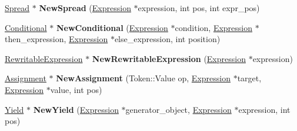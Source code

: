 \begin{DoxyCompactItemize}
\item 
\hyperlink{classv8_1_1internal_1_1_spread}{Spread} $\ast$ {\bfseries New\+Spread} (\hyperlink{classv8_1_1internal_1_1_expression}{Expression} $\ast$expression, int pos, int expr\+\_\+pos)\hypertarget{classv8_1_1internal_1_1_b_a_s_e___e_m_b_e_d_d_e_d_a90de6cb9daeadcda2559c1b87ccb95bd}{}\label{classv8_1_1internal_1_1_b_a_s_e___e_m_b_e_d_d_e_d_a90de6cb9daeadcda2559c1b87ccb95bd}

\item 
\hyperlink{classv8_1_1internal_1_1_conditional}{Conditional} $\ast$ {\bfseries New\+Conditional} (\hyperlink{classv8_1_1internal_1_1_expression}{Expression} $\ast$condition, \hyperlink{classv8_1_1internal_1_1_expression}{Expression} $\ast$then\+\_\+expression, \hyperlink{classv8_1_1internal_1_1_expression}{Expression} $\ast$else\+\_\+expression, int position)\hypertarget{classv8_1_1internal_1_1_b_a_s_e___e_m_b_e_d_d_e_d_ab9448c695792cc7e1356b6277016249f}{}\label{classv8_1_1internal_1_1_b_a_s_e___e_m_b_e_d_d_e_d_ab9448c695792cc7e1356b6277016249f}

\item 
\hyperlink{classv8_1_1internal_1_1_rewritable_expression}{Rewritable\+Expression} $\ast$ {\bfseries New\+Rewritable\+Expression} (\hyperlink{classv8_1_1internal_1_1_expression}{Expression} $\ast$expression)\hypertarget{classv8_1_1internal_1_1_b_a_s_e___e_m_b_e_d_d_e_d_aa0ae1cb330f8b004bdcb769c3d2d69ec}{}\label{classv8_1_1internal_1_1_b_a_s_e___e_m_b_e_d_d_e_d_aa0ae1cb330f8b004bdcb769c3d2d69ec}

\item 
\hyperlink{classv8_1_1internal_1_1_assignment}{Assignment} $\ast$ {\bfseries New\+Assignment} (Token\+::\+Value op, \hyperlink{classv8_1_1internal_1_1_expression}{Expression} $\ast$target, \hyperlink{classv8_1_1internal_1_1_expression}{Expression} $\ast$value, int pos)\hypertarget{classv8_1_1internal_1_1_b_a_s_e___e_m_b_e_d_d_e_d_a5519cf13afc323d68168a22e5d40ab6c}{}\label{classv8_1_1internal_1_1_b_a_s_e___e_m_b_e_d_d_e_d_a5519cf13afc323d68168a22e5d40ab6c}

\item 
\hyperlink{classv8_1_1internal_1_1_yield}{Yield} $\ast$ {\bfseries New\+Yield} (\hyperlink{classv8_1_1internal_1_1_expression}{Expression} $\ast$generator\+\_\+object, \hyperlink{classv8_1_1internal_1_1_expression}{Expression} $\ast$expression, int pos)\hypertarget{classv8_1_1internal_1_1_b_a_s_e___e_m_b_e_d_d_e_d_a767aa8d3ac2d24a241778d8e5b411d88}{}\label{classv8_1_1internal_1_1_b_a_s_e___e_m_b_e_d_d_e_d_a767aa8d3ac2d24a241778d8e5b411d88}


\end{DoxyCompactItemize}
